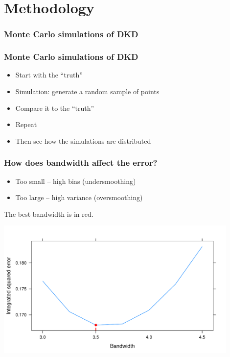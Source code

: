 \documentclass{beamer}
\begin{document}
\section{Methodology}

\subsubsection{Monte Carlo simulations of DKD}

\begin{frame}\frametitle{Monte Carlo simulations of DKD}
    \begin{itemize}
        \item Start with the ``truth''
        \item Simulation: generate a random sample of points
        \item Compare it to the ``truth''
        \item Repeat \textellipsis
    \end{itemize}
    \begin{itemize}
        \item Then see how the simulations are distributed
    \end{itemize}
\end{frame}

\begin{frame}\frametitle{How does bandwidth affect the error?}
    \begin{itemize}
        \item Too small -- high bias (undersmoothing)
        \item Too large -- high variance (oversmoothing)
    \end{itemize}
    \begin{example}{The best bandwidth is in \alert{red}.}
    \centerline{
        \label{fig:bandwidth-vs-error}
        \centering
        \includegraphics[width=0.9\textwidth]{error-bandwidth}
     }
    \end{example}
\end{frame}
\end{document}

